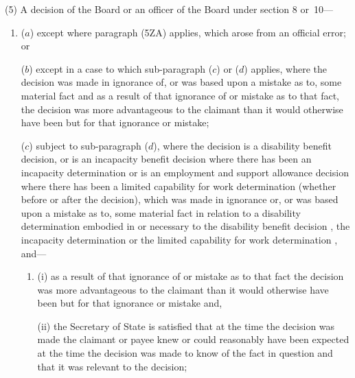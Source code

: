 \documentclass[12pt,a4paper]{article}
\begin{document}
(5) A decision of the 
Board or an officer of the Board  %
under section 8 or~10—
\begin{enumerate}\item[]
($a$) 
except where paragraph (5ZA) applies,  %
which arose from an official error; or

($b$) 
except in a case to which sub-paragraph ($c$)  or ($d$)  applies,  %
where the decision was made in ignorance of, or was based upon a mistake as to, some material fact and as a result of that ignorance of or mistake as to that fact, the decision was more advantageous to the claimant than it would otherwise have been but for that ignorance or mistake;


($c$) 
subject to sub-paragraph ($d$),  %
where the decision is a disability benefit decision, or is an incapacity benefit decision where there has been an incapacity determination 
or is an employment and support allowance decision where there has been a limited capability for work determination  %
(whether before or after the decision), which was made in ignorance or, or was based upon a mistake as to, some material fact in relation to a disability determination embodied in or necessary to the disability benefit decision%
, the incapacity determination or the limited capability for work determination%
, and---
\begin{enumerate}\item[]
(i) as a result of that ignorance of or mistake as to that fact the decision was more advantageous to the claimant than it would otherwise have been but for that ignorance or mistake and,

(ii) the Secretary of State is satisfied that at the time the decision was made the claimant or payee knew or could reasonably have been expected at the time the decision was made to know of the fact in question and that it was relevant to the decision;
\end{enumerate}


\end{enumerate}
\end{document}
